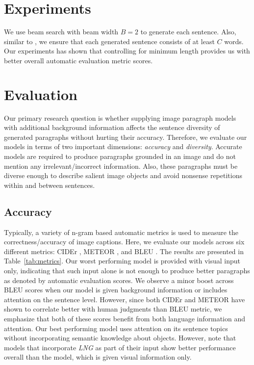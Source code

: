 \documentclass[11pt,a4paper]{article}
\begin{document}
\section{Experiments}

We use beam search with beam width $B = 2$ to generate each sentence.
Also, similar to , we ensure that each generated sentence consists of at least $C$ words.
Our experiments has shown that controlling for minimum length provides us with better overall automatic evaluation metric scores.


\section{Evaluation}

Our primary research question is whether supplying image paragraph models with additional background information affects the sentence diversity of generated paragraphs without hurting their accuracy.
Therefore, we evaluate our models in terms of two important dimensions: \textit{accuracy} and \textit{diversity}.
Accurate models are required to produce paragraphs grounded in an image and do not mention any irrelevant/incorrect information.
Also, these paragraphs must be diverse enough to describe salient image objects and avoid nonsense repetitions within and between sentences.

\subsection{Accuracy}
Typically, a variety of n-gram based automatic metrics is used to measure the correctness/accuracy of image captions.
Here, we evaluate our models across six different metrics: CIDEr \cite{vedantam2014cider}, METEOR \cite{meteor14}, and BLEU \cite{bleu}.
The results are presented in Table~\ref{tab:metrics}.
Our worst performing model is provided with visual input only, indicating that such input alone is not enough to produce better paragraphs as denoted by automatic evaluation scores.
We observe a minor boost across BLEU scores when our model is given background information or includes attention on the sentence level.
However, since both CIDEr and METEOR have shown to correlate better with human judgments than BLEU metric, we emphasize that both of these scores benefit from both language information and attention.
Our best performing model uses attention on its sentence topics without incorporating semantic knowledge about objects.
However, note that models that incorporate \textit{LNG} as part of their input show better performance overall than the model, which is given visual information only.
\end{document}
